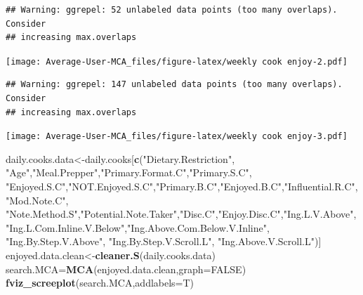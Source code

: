 \documentclass[
]{article}
\newenvironment{Shaded}{\begin{snugshade}}{\end{snugshade}}
\newcommand{\DataTypeTok}[1]{\textcolor[rgb]{0.13,0.29,0.53}{#1}}
\newcommand{\KeywordTok}[1]{\textcolor[rgb]{0.13,0.29,0.53}{\textbf{#1}}}
\newcommand{\NormalTok}[1]{#1}
\newcommand{\OtherTok}[1]{\textcolor[rgb]{0.56,0.35,0.01}{#1}}
\newcommand{\StringTok}[1]{\textcolor[rgb]{0.31,0.60,0.02}{#1}}
\begin{document}
\begin{verbatim}
## Warning: ggrepel: 52 unlabeled data points (too many overlaps). Consider
## increasing max.overlaps
\end{verbatim}

\texttt{[image: Average-User-MCA\_files/figure-latex/weekly cook enjoy-2.pdf]}

\begin{Shaded}
\end{Shaded}

\begin{verbatim}
## Warning: ggrepel: 147 unlabeled data points (too many overlaps). Consider
## increasing max.overlaps
\end{verbatim}

\texttt{[image: Average-User-MCA\_files/figure-latex/weekly cook enjoy-3.pdf]}

\begin{Shaded}
\begin{Highlighting}[]
\NormalTok{daily.cooks.data<-daily.cooks[}\KeywordTok{c}\NormalTok{(}\StringTok{"Dietary.Restriction"}\NormalTok{, }\StringTok{"Age"}\NormalTok{,}\StringTok{"Meal.Prepper"}\NormalTok{,}\StringTok{"Primary.Format.C"}\NormalTok{,}\StringTok{"Primary.S.C"}\NormalTok{,}
            \StringTok{"Enjoyed.S.C"}\NormalTok{,}\StringTok{"NOT.Enjoyed.S.C"}\NormalTok{,}\StringTok{"Primary.B.C"}\NormalTok{,}\StringTok{"Enjoyed.B.C"}\NormalTok{,}\StringTok{"Influential.R.C"}\NormalTok{, }
            \StringTok{"Mod.Note.C"}\NormalTok{, }
            \StringTok{"Note.Method.S"}\NormalTok{,}\StringTok{"Potential.Note.Taker"}\NormalTok{,}\StringTok{"Disc.C"}\NormalTok{,}\StringTok{"Enjoy.Disc.C"}\NormalTok{,}\StringTok{"Ing.L.V.Above"}\NormalTok{,}
            \StringTok{"Ing.L.Com.Inline.V.Below"}\NormalTok{,}\StringTok{"Ing.Above.Com.Below.V.Inline"}\NormalTok{,  }\StringTok{"Ing.By.Step.V.Above"}\NormalTok{,  }\StringTok{"Ing.By.Step.V.Scroll.L"}\NormalTok{,}
            \StringTok{"Ing.Above.V.Scroll.L"}\NormalTok{)]}
\NormalTok{enjoyed.data.clean<-}\KeywordTok{cleaner.S}\NormalTok{(daily.cooks.data)}
\NormalTok{search.MCA=}\KeywordTok{MCA}\NormalTok{(enjoyed.data.clean,}\DataTypeTok{graph=}\OtherTok{FALSE}\NormalTok{)}
\KeywordTok{fviz_screeplot}\NormalTok{(search.MCA,}\DataTypeTok{addlabels=}\NormalTok{T)}
\end{Highlighting}
\end{Shaded}
\end{document}
